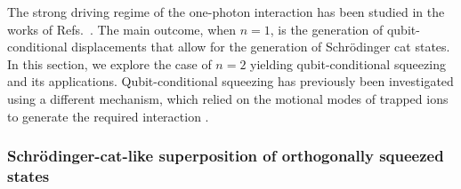 The strong driving regime of the one-photon interaction has been studied in the works of Refs.~\cite{SolanoCat,ResSchCats}. The main outcome, when $n=1$, is the generation of qubit-conditional displacements that allow for the generation of Schr\"odinger cat states. In this section, we explore the case of $n=2$ yielding qubit-conditional squeezing and its applications. Qubit-conditional squeezing has previously been investigated using a different mechanism, which relied on the motional modes of trapped ions to generate the required interaction \cite{SD-MotSqueezing}. 


\subsubsection{Schr\"odinger-cat-like superposition of orthogonally squeezed states}

